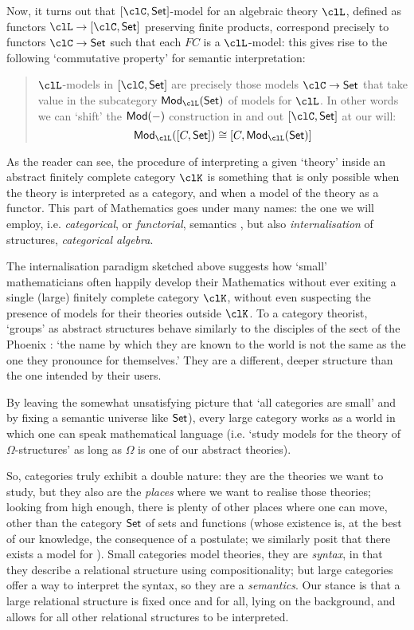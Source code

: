 Now, it turns out that $[\clC,\Set]$-model for an algebraic theory $\clL$, defined as functors $\clL \to [\clC,\Set]$ preserving finite products, correspond precisely to functors $\clC\to \Set$ such that each $FC$ is a $\clL$-model: this gives rise to the following `commutative property' for semantic interpretation:
\begin{quote}
	$\clL$-models in $[\clC,\Set]$ are precisely those models $\clC \to \Set$ that take value in the subcategory $\cate{Mod}_{\clL}(\Set)$ of models for $\clL$. In other words we can `shift' the $\mathsf{Mod}(-)$ construction in and out $[\clC,\Set]$ at our will:
	\[
		\cate{Mod}_{\clL}([C,\Set]) \cong [C, \cate{Mod}_{\clL}(\Set)]
	\]
\end{quote}
As the reader can see, the procedure of interpreting a given `theory' inside an abstract finitely complete category $\clK$ is something that is only possible when the theory is interpreted as a category, and when a model of the theory as a functor. This part of Mathematics goes under many names: the one we will employ, i.e. \emph{categorical}, or \emph{functorial}, semantics \cite{lawvere1963functorial}, but also \emph{internalisation} of structures, \emph{categorical algebra}.

The internalisation paradigm sketched above suggests how `small' mathematicians often happily develop their Mathematics without ever exiting a single (large) finitely complete category $\clK$, without even suspecting the presence of models for their theories outside $\clK$. To a category theorist, `groups' as abstract structures behave similarly to the disciples of the sect of the Phoenix \cite{fenix}: `the name by which they are known to the world is not the same as the one they pronounce for themselves.' They are a different, deeper structure than the one intended by their users.

By leaving the somewhat unsatisfying picture that `all categories are small' and by fixing a semantic universe like $\mathsf{Set}$), every large category works as a world in which one can speak mathematical language (i.e. `study models for the theory of $\Omega$-structures' as long as $\Omega$ is one of our abstract theories).

So, categories truly exhibit a double nature: they are the theories we want to study, but they also are the \emph{places} where we want to realise those theories; looking from high enough, there is plenty of other places where one can move, other than the category $\mathsf{Set}$ of sets and functions (whose existence is, at the best of our knowledge, the consequence of a postulate; we similarly posit that there exists a model for ). Small categories model theories, they are \emph{syntax}, in that they describe a relational structure using compositionality; but large categories offer a way to interpret the syntax, so they are a \emph{semantics}. Our stance is that a large relational structure is fixed once and for all, lying on the background, and allows for all other relational structures to be interpreted.

